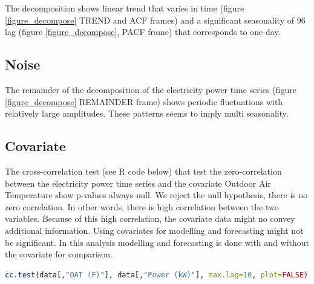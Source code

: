 The decomposition shows linear trend that varies in time (figure \ref{figure_decompose} TREND and 
ACF frames) and a significant seasonality of 96 lag (figure \ref{figure_decompose}, PACF frame) that 
corresponds to one day.

\subsection{Noise}
The remainder of the decomposition of the electricity power time series (figure 
\ref{figure_decompose} REMAINDER frame) shows periodic fluctuations with relatively large 
amplitudes. These patterns seems to imply multi seasonality.

\subsection{Covariate}
The cross-correlation test (see R code below) that test the zero-correlation between the 
electricity power time series and the covariate Outdoor Air Temperature show p-values always null. 
We reject the null hypothesis, there is no zero correlation. In other words, there is high 
correlation between the two variables. Because of this high correlation, the covariate data might 
no convey additional information. Using covariates for modelling and forecasting might not be 
significant. In this analysis modelling and forecasting is done with and without the covariate for 
comparison.

\begin{lstlisting}[language=R]
cc.test(data[,"OAT (F)"], data[,"Power (kW)"], max.lag=10, plot=FALSE) 
\end{lstlisting}
